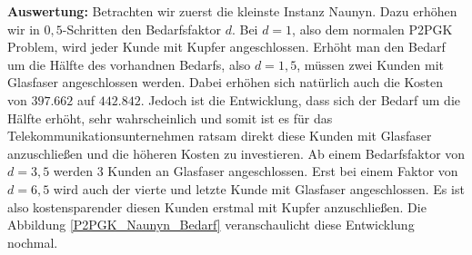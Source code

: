 \documentclass[11pt,a4paper]{article}
\theoremstyle{my_th_style1}
\begin{document}
\textbf{Auswertung:}
Betrachten wir zuerst die kleinste Instanz Naunyn.
Dazu erhöhen wir in $0,5$-Schritten den Bedarfsfaktor $d$. Bei $d=1$, also dem normalen P2PGK Problem, wird jeder Kunde mit Kupfer angeschlossen. Erhöht man den Bedarf um die Hälfte des vorhandnen Bedarfs, also $d=1,5$, müssen zwei Kunden mit Glasfaser angeschlossen werden. Dabei erhöhen sich natürlich auch die Kosten von $397.662$ auf $442.842$.
Jedoch ist die Entwicklung, dass sich der Bedarf um die Hälfte erhöht, sehr wahrscheinlich und somit ist es f\"ur das Telekommunikationsunternehmen ratsam direkt diese Kunden mit Glasfaser anzuschließen und die höheren Kosten zu investieren.
Ab einem Bedarfsfaktor von $d=3,5$ werden 3 Kunden an Glasfaser angeschlossen.
Erst bei einem Faktor von $d=6,5$ wird auch der vierte und letzte Kunde mit Glasfaser angeschlossen. 
Es ist also kostensparender diesen Kunden erstmal mit Kupfer anzuschließen.
Die Abbildung \ref{P2PGK_Naunyn_Bedarf} veranschaulicht diese Entwicklung nochmal.
\end{document}
